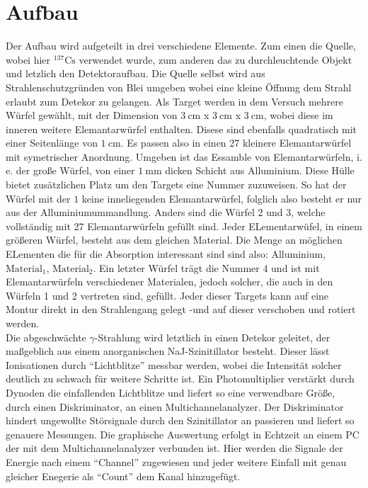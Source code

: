 \section{Aufbau}
Der Aufbau wird aufgeteilt in drei verschiedene Elemente. Zum einen die Quelle, wobei hier $^137\text{Cs}$ verwendet wurde, 
zum anderen das zu durchleuchtende Objekt und letzlich den Detektoraufbau. 
Die Quelle selbst wird aus Strahlenschutzgründen von Blei umgeben wobei eine kleine Öffnung dem Strahl erlaubt zum Detekor zu gelangen.
Als Target werden in dem Versuch mehrere Würfel gewählt, mit der Dimension von $\SI{3}{\centi\meter}$ x $\SI{3}{\centi\meter}$ x $\SI{3}{\centi\meter}$,
wobei diese im inneren weitere Elemantarwürfel enthalten. Disese sind ebenfalls quadratisch mit einer Seitenlänge von $\SI{1}{\centi\meter}$.
Es passen also in einen 27 kleinere Elemantarwürfel mit symetrischer Anordnung. Umgeben ist das Essamble von Elemantarwürfeln, i. e.
der große Würfel, von einer $\SI{1}{\milli\meter}$ dicken Schicht aus Alluminium. Diese Hülle bietet zusätzlichen Platz um 
den Targets eine Nummer zuzuweisen. So hat der Würfel mit der $1$ keine inneliegenden Elemantarwürfel, folglich also besteht er nur aus
der Alluminiumummandlung. Anders sind die Würfel 2 und 3, welche vollständig mit 27 Elemantarwürfeln gefüllt sind.
Jeder ELementarwüfel, in einem größeren Würfel, besteht aus dem gleichen Material. Die Menge an möglichen ELementen die für die Absorption 
interessant sind sind also: Alluminium, $\text{Material}_{1}$, $\text{Material}_{2}$.
Ein letzter Würfel trägt die Nummer 4 und ist mit Elemantarwürfeln verschiedener Materialen, jedoch solcher, die auch in den Würfeln 1 und 2 vertreten sind, gefüllt.
Jeder dieser Targets kann auf eine Montur direkt in den Strahlengang gelegt -und auf dieser verschoben und rotiert werden.
\\
\newline
Die abgeschwächte $\gamma$-Strahlung wird letztlich in einen Detekor geleitet, der maßgeblich aus einem anorganischen NaJ-Szinitillator besteht.
Dieser lässt Ionisationen durch \enquote{Lichtblitze} messbar werden, wobei die Intensität solcher deutlich zu schwach für weitere Schritte ist.
Ein Photomultiplier verstärkt durch Dynoden die einfallenden Lichtblitze und liefert so eine verwendbare Größe, durch einen Diskriminator, 
an einen Multichannelanalyzer. Der Diskriminator hindert ungewollte Störsignale durch den Szinitillator an passieren und liefert so genauere Messungen.
Die graphische Auswertung erfolgt in Echtzeit an einem PC der mit dem Multichannelanalyzer verbunden ist. Hier werden die Signale 
der Energie nach einem \enquote{Channel} zugewiesen und jeder weitere Einfall mit genau gleicher Enegerie als \enquote{Count} dem Kanal hinzugefügt.


